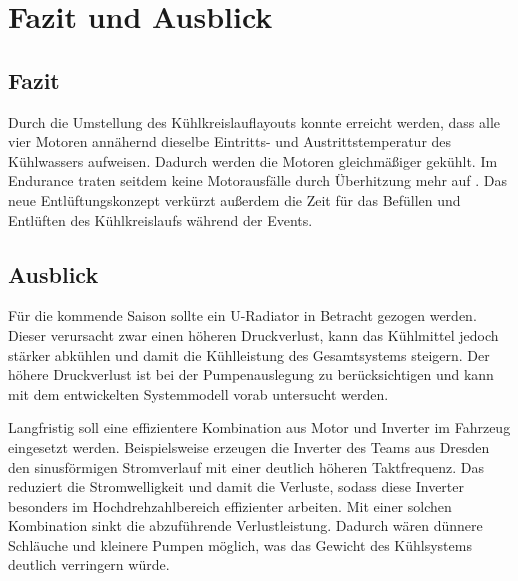 \chapter{Fazit und Ausblick}
\label{ch:fazit}

\section{Fazit}
\label{sec:fazit}

Durch die Umstellung des Kühlkreislauflayouts konnte erreicht werden, dass
alle vier Motoren annähernd dieselbe Eintritts- und Austrittstemperatur des
Kühlwassers aufweisen. Dadurch werden die Motoren gleichmäßiger gekühlt. Im
Endurance traten seitdem keine Motorausfälle durch Überhitzung mehr auf
\cite{TODO_Quelle_bzw_Verweis_auf_Messdaten}. Das neue Entlüftungskonzept
verkürzt außerdem die Zeit für das Befüllen und Entlüften des Kühlkreislaufs
während der Events.


\section{Ausblick}
\label{sec:ausblick}

Für die kommende Saison sollte ein U-Radiator in Betracht gezogen werden.
Dieser verursacht zwar einen höheren Druckverlust, kann das Kühlmittel
jedoch stärker abkühlen und damit die Kühlleistung des Gesamtsystems
steigern. Der höhere Druckverlust ist bei der Pumpenauslegung zu
berücksichtigen und kann mit dem entwickelten Systemmodell vorab untersucht
werden.

Langfristig soll eine effizientere Kombination aus Motor und Inverter im
Fahrzeug eingesetzt werden. Beispielsweise erzeugen die Inverter des
Teams aus Dresden~\cite{TODO_Quelle} den sinusförmigen Stromverlauf mit einer
deutlich höheren Taktfrequenz. Das reduziert die Stromwelligkeit und damit
die Verluste, sodass diese Inverter besonders im Hochdrehzahlbereich
effizienter arbeiten. Mit einer solchen Kombination sinkt die abzuführende
Verlustleistung. Dadurch wären dünnere Schläuche und kleinere Pumpen
möglich, was das Gewicht des Kühlsystems deutlich verringern würde.

\pagebreak